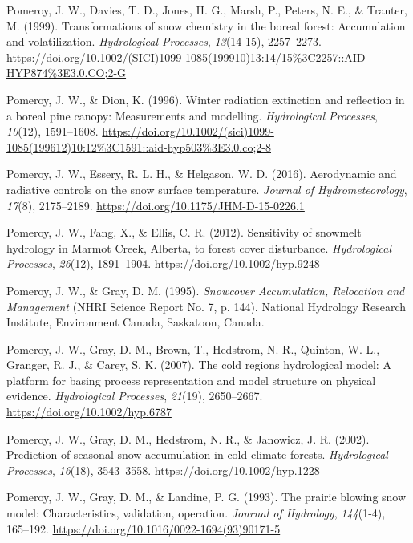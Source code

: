 \documentclass[
  letterpaper,
]{tex/uofsthesis-cs}
\newlength{\cslhangindent}
\newenvironment{CSLReferences}[2] %
 {\begin{list}{}{%
  \setlength{\itemindent}{0pt}
  \setlength{\leftmargin}{0pt}
  \setlength{\parsep}{0pt}
  \ifodd #1
   \setlength{\leftmargin}{\cslhangindent}
   \setlength{\itemindent}{-1\cslhangindent}
  \fi
  \setlength{\itemsep}{#2\baselineskip}}}
 {\end{list}}
\begin{document}
\begin{CSLReferences}{1}{0}
Pomeroy, J. W., Davies, T. D., Jones, H. G., Marsh, P., Peters, N. E.,
\& Tranter, M. (1999). Transformations of snow chemistry in the boreal
forest: Accumulation and volatilization. \emph{Hydrological Processes},
\emph{13}(14-15), 2257--2273.
\url{https://doi.org/10.1002/(SICI)1099-1085(199910)13:14/15\%3C2257::AID-HYP874\%3E3.0.CO;2-G}

Pomeroy, J. W., \& Dion, K. (1996). Winter radiation extinction and
reflection in a boreal pine canopy: {Measurements} and modelling.
\emph{Hydrological Processes}, \emph{10}(12), 1591--1608.
\url{https://doi.org/10.1002/(sici)1099-1085(199612)10:12\%3C1591::aid-hyp503\%3E3.0.co;2-8}

Pomeroy, J. W., Essery, R. L. H., \& Helgason, W. D. (2016). Aerodynamic
and radiative controls on the snow surface temperature. \emph{Journal of
Hydrometeorology}, \emph{17}(8), 2175--2189.
\url{https://doi.org/10.1175/JHM-D-15-0226.1}

Pomeroy, J. W., Fang, X., \& Ellis, C. R. (2012). Sensitivity of
snowmelt hydrology in {Marmot Creek}, {Alberta}, to forest cover
disturbance. \emph{Hydrological Processes}, \emph{26}(12), 1891--1904.
\url{https://doi.org/10.1002/hyp.9248}

Pomeroy, J. W., \& Gray, D. M. (1995). \emph{Snowcover {Accumulation},
{Relocation} and {Management}} (NHRI Science Report No. 7, p. 144).
National Hydrology Research Institute, Environment Canada, Saskatoon,
Canada.

Pomeroy, J. W., Gray, D. M., Brown, T., Hedstrom, N. R., Quinton, W. L.,
Granger, R. J., \& Carey, S. K. (2007). The cold regions hydrological
model: A platform for basing process representation and model structure
on physical evidence. \emph{Hydrological Processes}, \emph{21}(19),
2650--2667. \url{https://doi.org/10.1002/hyp.6787}

Pomeroy, J. W., Gray, D. M., Hedstrom, N. R., \& Janowicz, J. R. (2002).
Prediction of seasonal snow accumulation in cold climate forests.
\emph{Hydrological Processes}, \emph{16}(18), 3543--3558.
\url{https://doi.org/10.1002/hyp.1228}

Pomeroy, J. W., Gray, D. M., \& Landine, P. G. (1993). The prairie
blowing snow model: Characteristics, validation, operation.
\emph{Journal of Hydrology}, \emph{144}(1-4), 165--192.
\url{https://doi.org/10.1016/0022-1694(93)90171-5}


\end{CSLReferences}
\end{document}
